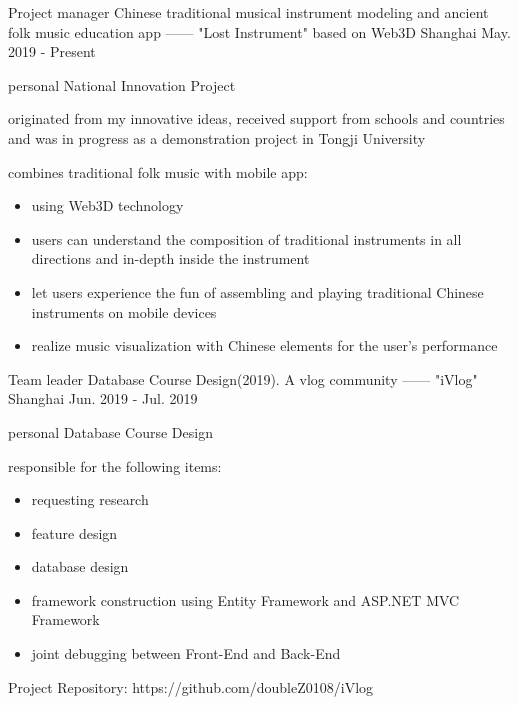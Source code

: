 
\begin{cventries}
  \cventry
    {Project manager} %
    {Chinese traditional musical instrument modeling and ancient folk music education app —— "Lost Instrument" based on Web3D} %
    {Shanghai} %
    {May. 2019 - Present} %
    {
      \begin{cvitems} %
        \item {personal National Innovation Project}
		\item {originated from my innovative ideas, received support from schools and countries and was in progress as a demonstration project in Tongji University}
		\item {combines traditional folk music with mobile app:}
		\begin{itemize}
		    \item {using Web3D technology}
		    \item {users can understand the composition of traditional instruments in all directions and in-depth inside the instrument}
		    \item {let users experience the fun of assembling and playing traditional Chinese instruments on mobile devices}
		    \item {realize music visualization with Chinese elements for the user's performance}
		\end{itemize}
      \end{cvitems}
    }

  \cventry
    {Team leader} %
    {Database Course Design(2019). A vlog community —— "iVlog"} %
    {Shanghai} %
    {Jun. 2019 - Jul. 2019} %
    {
      \begin{cvitems} %
        \item {personal Database Course Design}
		\item {responsible for the following items:}
		\begin{itemize}
		    \item {requesting research}
		    \item {feature design}
		    \item {database design}
		    \item {framework construction using Entity Framework and ASP.NET MVC Framework}
		    \item {joint debugging between Front-End and Back-End}
		\end{itemize}
		\item {Project Repository: https://github.com/doubleZ0108/iVlog}
      \end{cvitems}
    }


\end{cventries}
